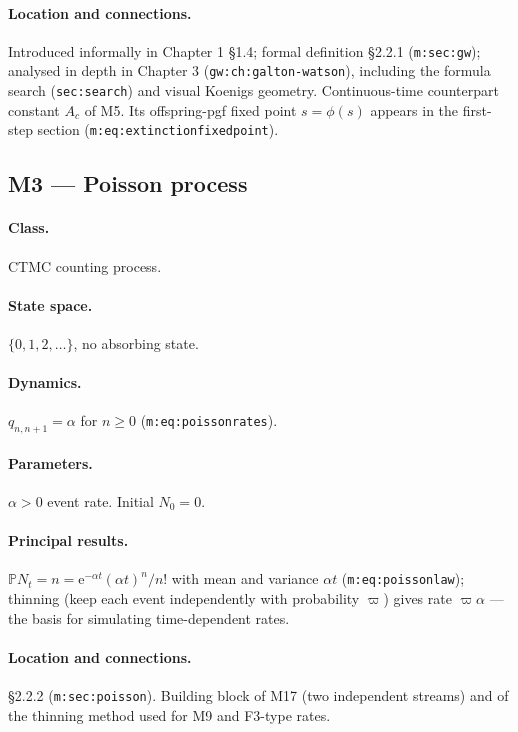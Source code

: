 \documentclass[11pt,a4paper]{article}
\newcommand{\PR}{\mathbb{P}}
\newcommand{\ee}{\mathrm{e}}
\begin{document}
\paragraph{Location and connections.} Introduced informally in Chapter 1
\S1.4; formal definition \S2.2.1 (\texttt{m:sec:gw}); analysed in depth in
Chapter 3 (\texttt{gw:ch:galton-watson}), including the formula search
(\texttt{sec:search}) and visual Koenigs geometry. Continuous-time
counterpart constant $A_c$ of M5. Its offspring-pgf fixed point
$s=\phi(s)$ appears in the first-step section (\texttt{m:eq:extinctionfixedpoint}).

\subsection{M3 --- Poisson process}

\paragraph{Class.} CTMC counting process.

\paragraph{State space.} $\{0,1,2,\ldots\}$, no absorbing state.

\paragraph{Dynamics.} $q_{n,n+1}=\alpha$ for $n\ge0$
(\texttt{m:eq:poissonrates}).

\paragraph{Parameters.} $\alpha>0$ event rate. Initial $N_0=0$.

\paragraph{Principal results.}
$\PR{N_t=n}=\ee^{-\alpha t}(\alpha t)^n/n!$ with mean and variance $\alpha t$
(\texttt{m:eq:poissonlaw}); thinning (keep each event independently with
probability $\varpi$) gives rate $\varpi\alpha$ --- the basis for simulating
time-dependent rates.

\paragraph{Location and connections.} \S2.2.2 (\texttt{m:sec:poisson}).
Building block of M17 (two independent streams) and of the thinning method
used for M9 and F3-type rates.
\end{document}
